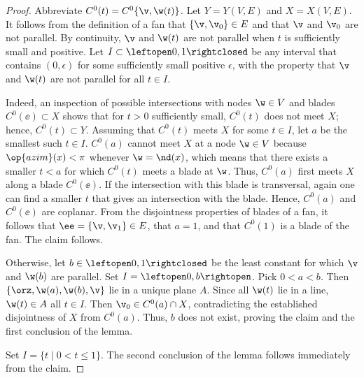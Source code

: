 \begin{proof}
Abbreviate $C^0(t) = C^0\{\v,\w(t)\}$.
Let $Y = Y(V,E)$ and $X = X(V,E)$.
It follows from the definition of a fan that $\{\v,\v_0\}\in E$ and
that $\v$ and $\v_0$ are not parallel.  By continuity, $\v$ and $\w(t)$
are not parallel when $t$ is sufficiently small and positive.  
Let $I\subset\leftopen0,1\rightclosed$ be any interval that contains
$(0,\epsilon)$ for some sufficiently small positive $\epsilon$, with the
property that $\v$ and $\w(t)$ are not parallel for all $t\in I$.

  Indeed, an inspection of possible
intersections with nodes $\w\in V$ and blades $C^0(\ee)\subset X$
shows that for $t>0$ sufficiently small, $C^0(t)$ does not meet $X$;
hence, $C^0(t)\subset Y$.  Assuming that $C^0(t)$ meets $X$ for some
$t\in I$, let $a$ be the smallest such $t\in I$.  $C^0(a)$ cannot meet
$X$ at a node $\w\in V$ because $\op{azim}(x)<\pi$ whenever
$\w=\nd(x)$, which means that
there exists a smaller $t<a$ for which $C^0(t)$ meets a blade at $\w$.
Thus, $C^0(a)$ first meets $X$ along a blade $C^0(\ee)$. If the
intersection with this blade is transversal, again one can find a
smaller $t$ that gives an intersection with the blade.  Hence,
$C^0(a)$ and $C^0(\ee)$ are coplanar.  From the disjointness
properties of blades of a fan, it follows that $\ee = \{\v,\v_1\}\in
E$, that $a=1$, and that $C^0(1)$ is a blade of the fan.  The claim
follows.

  Otherwise, let $b\in
\leftopen0,1\rightclosed$ be the least constant for which $\v$ and
$\w(b)$ are parallel.  Set  $I=\leftopen0,b\rightopen$.  
Pick $0<a<b$.  Then $\{\orz,\w(a),\w(b),\v\}$ lie in a unique plane
$A$.  Since all $\w(t)$ lie in a line, $\w(t)\in A$ all $t\in I$.
Then $\v_0\in C^0(a)\cap X$, contradicting the established
disjointness of $X$ from $C^0(a)$.  Thus, $b$ does not exist, proving
 the claim and the first conclusion of the lemma.

Set $I= \{t\mid 0 < t \le 1\}$.  The second conclusion of the lemma
follows immediately from the claim.
\end{proof}


